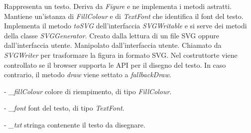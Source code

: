 Rappresenta un testo.
Deriva da \textit{Figure} e ne implementa i metodi astratti. Mantiene un'istanza di \textit{FillColour} e di \textit{TextFont} che identifica il font del testo. Implementa il metodo \textit{toSVG} dell'interfaccia \textit{SVGWritable} e si serve dei metodi della classe \textit{SVGGenerator}.
Creato dalla lettura di un file SVG oppure dall'interfaccia utente. Manipolato dall'interfaccia utente. Chiamato da \textit{SVGWriter} per trasformare la figura in formato SVG.
Nel costruttorte viene controllato se il browser supporta le API per il disegno del testo. In caso contrario, il metodo \textit{draw} viene settato a \textit{fallbackDraw}.
\begin{elencopuntato}[\normindent]
\item[-] \textit{{\_}fillColour} colore di riempimento, di tipo \textit{FillColour}.
\item[-] \textit{{\_}font} font del testo, di tipo \textit{TextFont}.
\item[-] \textit{{\_}txt} stringa contenente il testo da disegnare.
\end{elencopuntato}
